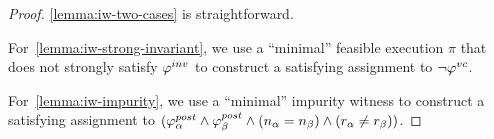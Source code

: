 \begin{proof}

\ref{lemma:iw-two-cases} is straightforward.

For~\ref{lemma:iw-strong-invariant}, we use a ``minimal'' feasible execution $\pi$ that does not strongly satisfy $\varphi^{inv}$
to construct a satisfying assignment to $\neg \varphi^{vc}$.

For~\ref{lemma:iw-impurity}, we use a ``minimal'' impurity witness to construct a satisfying assignment to
$(\varphi^{post}_\alpha \wedge \varphi^{post}_\beta \wedge (n_\alpha = n_\beta) \wedge (r_\alpha \neq r_\beta))$.

%
%
\end{proof}
